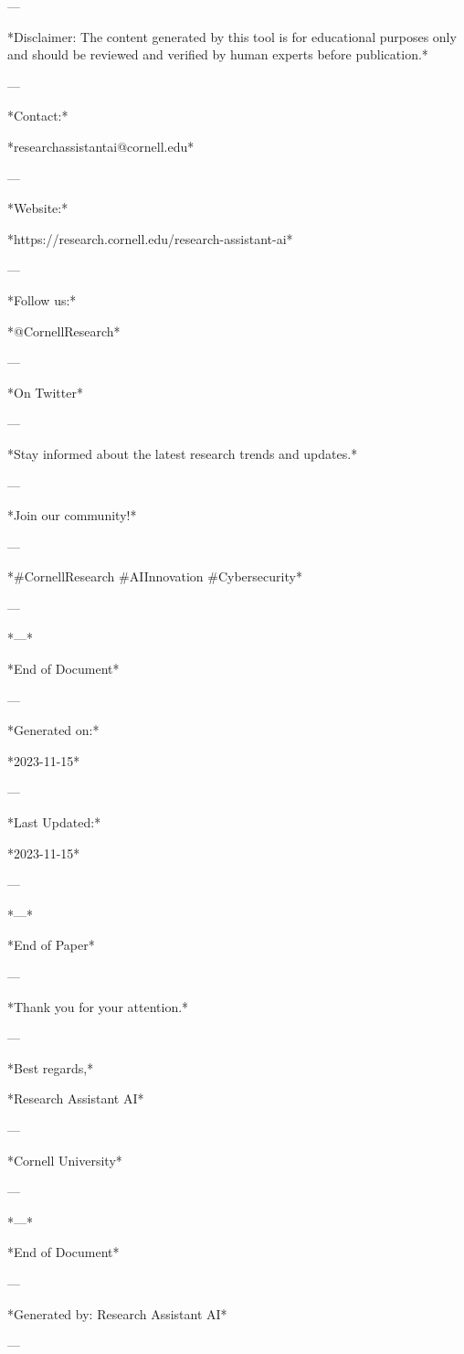 --- 

*Disclaimer: The content generated by this tool is for educational purposes only and should be reviewed and verified by human experts before publication.* 

--- 

*Contact:* 

*researchassistantai@cornell.edu* 

--- 

*Website:* 

*https://research.cornell.edu/research-assistant-ai* 

--- 

*Follow us:* 

*@CornellResearch* 

--- 

*On Twitter* 

--- 

*Stay informed about the latest research trends and updates.* 

--- 

*Join our community!* 

--- 

*#CornellResearch #AIInnovation #Cybersecurity* 

--- 

*---* 

*End of Document* 

--- 

*Generated on:* 

*2023-11-15* 

--- 

*Last Updated:* 

*2023-11-15* 

--- 

*---* 

*End of Paper* 

--- 

*Thank you for your attention.* 

--- 

*Best regards,* 

*Research Assistant AI* 

--- 

*Cornell University* 

--- 

*---* 

*End of Document* 

--- 

*Generated by: Research Assistant AI* 

--- 

